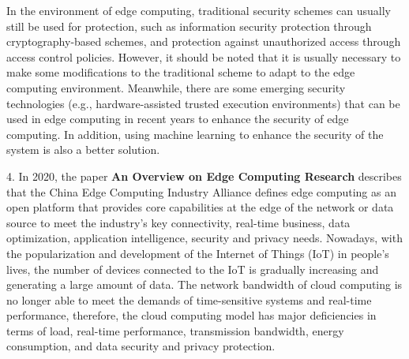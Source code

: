 \documentclass[a4paper,twoside]{scrbook}
\begin{document}
\begin{CJK}{UTF8}{gbsn}
In the environment of edge computing, traditional security schemes can usually still be used for protection, such as information security protection through cryptography-based schemes, and protection against unauthorized access through access control policies. However, it should be noted that it is usually necessary to make some modifications to the traditional scheme to adapt to the edge computing environment. Meanwhile, there are some emerging security technologies (e.g., hardware-assisted trusted execution environments) that can be used in edge computing in recent years to enhance the security of edge computing. In addition, using machine learning to enhance the security of the system is also a better solution.


4. In 2020, the paper \textbf{An Overview on Edge Computing Research}\cite{cao2020overview} describes that the China Edge Computing Industry Alliance defines edge computing as an open platform that provides core capabilities at the edge of the network or data source to meet the industry's key connectivity, real-time business, data optimization, application intelligence, security and privacy needs. Nowadays, with the popularization and development of the Internet of Things (IoT) in people's lives, the number of devices connected to the IoT is gradually increasing and generating a large amount of data. The network bandwidth of cloud computing is no longer able to meet the demands of time-sensitive systems and real-time performance, therefore, the cloud computing model has major deficiencies in terms of load, real-time performance, transmission bandwidth, energy consumption, and data security and privacy protection.


\end{CJK}
\end{document}
